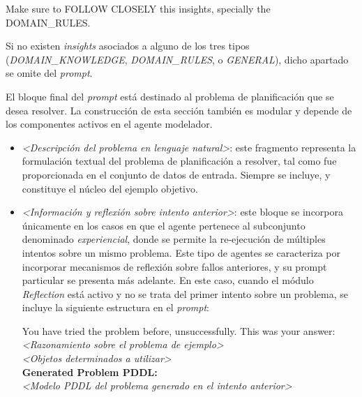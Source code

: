 \begin{anexes}
\begin{itemize}
\begin{tcolorbox}[colback=gray!10!white, colframe=black, title=Bloque de \textit{insights}, fonttitle=\bfseries, breakable]
    Make sure to FOLLOW CLOSELY this insights, specially the DOMAIN\_RULES.
    \end{tcolorbox}

    Si no existen \textit{insights} asociados a alguno de los tres tipos (\textit{DOMAIN\_KNOWLEDGE}, \textit{DOMAIN\_RULES}, o \textit{GENERAL}), dicho apartado se omite del \textit{prompt}.

\end{itemize}

El bloque final del \textit{prompt} está destinado al problema de planificación que se desea resolver. La construcción de esta sección también es modular y depende de los componentes activos en el agente modelador.

\begin{itemize}
    \item \textit{<Descripción del problema en lenguaje natural>}: este fragmento representa la formulación textual del problema de planificación a resolver, tal como fue proporcionada en el conjunto de datos de entrada. Siempre se incluye, y constituye el núcleo del ejemplo objetivo.

    \item \textit{<Información y reflexión sobre intento anterior>}: este bloque se incorpora únicamente en los casos en que el agente pertenece al subconjunto denominado \textit{experiencial}, donde se permite la re-ejecución de múltiples intentos sobre un mismo problema. Este tipo de agentes se caracteriza por incorporar mecanismos de reflexión sobre fallos anteriores, y su prompt particular se presenta más adelante. En este caso, cuando el módulo \textit{Reflection} está activo y no se trata del primer intento sobre un problema, se incluye la siguiente estructura en el \textit{prompt}:

    \begin{tcolorbox}[colback=gray!10!white, colframe=black, title=Bloque de reflexión sobre intento anterior, fonttitle=\bfseries, breakable]
    You have tried the problem before, unsuccessfully. This was your answer: \\

    \textit{<Razonamiento sobre el problema de ejemplo>} \\

    \textit{<Objetos determinados a utilizar>} \\

    \textbf{Generated Problem PDDL:} \\
    \textit{<Modelo PDDL del problema generado en el intento anterior>} \\


\end{tcolorbox}
\end{itemize}
\end{anexes}

